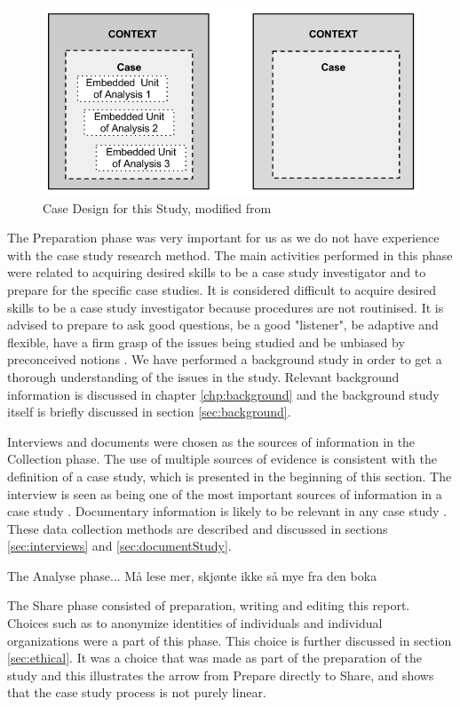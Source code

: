 \begin{figure}[ht]
\begin{center}
\includegraphics[scale=0.685]{caseStructure.png}
\caption[Case Design for this Study]{Case Design for this Study, modified from \cite{CaseStudyResearch}}
\label{fig:caseDesign}
\end{center}
\end{figure}

The Preparation phase was very important for us as we do not have experience with the case study research method. The main activities performed in this phase were related to acquiring desired skills to be a case study investigator and to prepare for the specific case studies. It is considered difficult to acquire desired skills to be a case study investigator because procedures are not routinised. It is advised to prepare to ask good questions, be a good "listener", be adaptive and flexible, have a firm grasp of the issues being studied and be unbiased by preconceived notions \cite{CaseStudyResearch}. We have performed a background study in order to get a thorough understanding of the issues in the study. Relevant background information is discussed in chapter \ref{chp:background} and the background study itself is briefly discussed in section \ref{sec:background}. %

Interviews and documents were chosen as the sources of information in the Collection phase. The use of multiple sources of evidence is consistent with the definition of a case study, which is presented in the beginning of this section. The interview is seen as being one of the most important sources of information in a case study \cite{CaseStudyResearch}. Documentary information is likely to be relevant in any case study \cite{CaseStudyResearch}. These data collection methods are described and discussed in sections \ref{sec:interviews} and \ref{sec:documentStudy}.

The Analyse phase... Må lese mer, skjønte ikke så mye fra den boka

The Share phase consisted of preparation, writing and editing this report. Choices such as to anonymize identities of individuals and individual organizations were a part of this phase. This choice is further discussed in section \ref{sec:ethical}. It was a choice that was made as part of the preparation of the study and this illustrates the arrow from Prepare directly to Share, and shows that the case study process is not purely linear. 